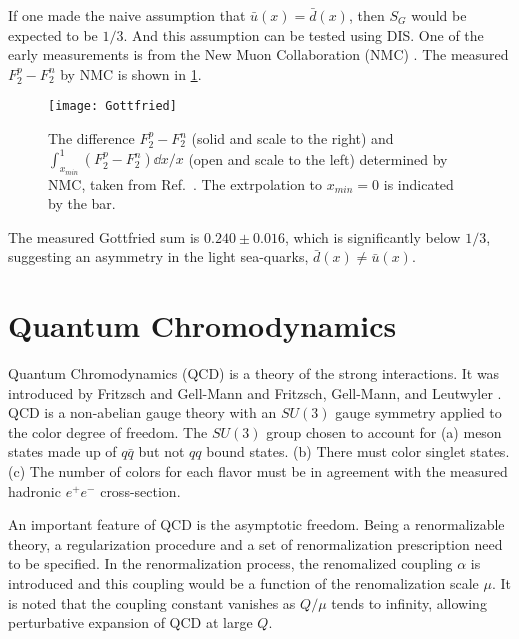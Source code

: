 \documentclass[../main.tex]{subfiles}
\begin{document}
If one made the naive assumption that $\bar{u}\left(x\right)= \bar{d}\left(x\right)$,
then $S_G$ would be expected to be $1/3$. And this assumption can be tested using DIS.
One of the early measurements is from the New Muon Collaboration (NMC) \cite{amaudruz1991}.
The measured $F_2^p-F_2^n$ by NMC is shown in \cref{fig:NMC_Gottfried}.
\begin{figure}[htbp!]
	\centering
	\texttt{[image: Gottfried]}
	\caption{The difference $F_2^p -F_2^n$ (solid and scale to the right) and
		$\int_{x_{min}}^1 (F_2^p-F_2^n)\dd{x}/x$ (open and scale to the left)
		determined by NMC, taken from Ref.~\cite{amaudruz1991}. The extrpolation
		to $x_{min}=0$ is indicated by the bar.}
	\label{fig:NMC_Gottfried}
\end{figure}
The measured Gottfried sum is $0.240 \pm 0.016$, which is significantly below
$1/3$, suggesting an asymmetry in the light sea-quarks, $\bar{d}(x)\neq \bar{u}(x)$.

\section{Quantum Chromodynamics}
\label{sec:QCD}
Quantum Chromodynamics (QCD) is a theory of the strong interactions. It was
introduced by Fritzsch and Gell-Mann \cite{fritzsch1972} and Fritzsch, Gell-Mann,
and Leutwyler \cite{fritzsch1973}. QCD is a non-abelian gauge theory with an
$SU(3)$ gauge symmetry applied to the color degree of freedom. The $SU(3)$ group
chosen to account for (a) meson states made up of $q\bar{q}$ but not $qq$ bound states.
(b) There must color singlet states. (c) The number of colors for each flavor
must be in agreement with the measured hadronic $e^+ e^-$ cross-section.


An important feature of QCD is the asymptotic freedom. Being a renormalizable
theory, a regularization procedure and a set of renormalization prescription
need to be specified. In the renormalization process, the renomalized coupling $\alpha$
is introduced and this coupling would be a function of the renomalization scale $\mu$.
It is noted that the coupling constant vanishes as $Q/\mu$ tends to infinity,
allowing perturbative expansion of QCD at large $Q$.
\end{document}
